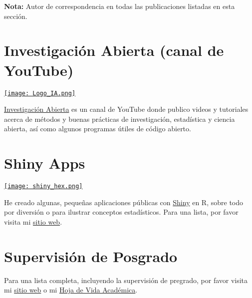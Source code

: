 \documentclass[11pt,a4paper,]{awesome-cv}
\begin{document}
\endgroup

\begin{footnotesize}
\textbf{Nota:} Autor de correspondencia en todas las publicaciones listadas en esta sección.
\end{footnotesize}

\section{Investigación Abierta (canal de
YouTube)}\label{investigaciuxf3n-abierta-canal-de-youtube}

\begin{minipage}[c]{0.15\linewidth}
\href{https://www.youtube.com/@InvestigacionAbierta}{\texttt{[image: Logo\_IA.png]}}
\end{minipage} \begin{minipage}[c]{0.85\linewidth}
\textcolor{red}{\faYoutube} \href{https://www.youtube.com/@InvestigacionAbierta}{Investigación Abierta} es un canal de YouTube donde publico videos y tutoriales acerca de métodos y buenas prácticas de investigación, estadística y ciencia abierta, así como algunos programas útiles de código abierto.
\end{minipage}

\section{Shiny Apps}\label{shiny-apps}

\begin{minipage}[c]{0.10\linewidth}
\href{https://jdleongomez.info/es/#shiny}{\texttt{[image: shiny\_hex.png]}}
\end{minipage} \begin{minipage}[c]{0.90\linewidth}
He creado algunas, pequeñas aplicaciones públicas con \href{https://shiny.posit.co/}{Shiny} en R, sobre todo por diversión o para ilustrar conceptos estadísticos. Para una lista, por favor visita mi \href{https://jdleongomez.info/es/#shiny}{sitio web}.
\end{minipage}

\section{Supervisión de Posgrado}\label{supervisiuxf3n-de-posgrado}

Para una lista completa, incluyendo la supervisión de pregrado, por
favor visita mi \href{https://jdleongomez.info/es/team/}{sitio web} o mi
\href{https://jdleongomez.info/es/files/jdl_cv_es.pdf}{Hoja de Vida
Académica}.
\end{document}
